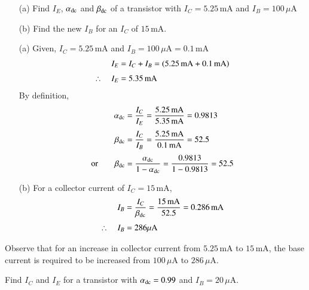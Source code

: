 \smallskip

\begin{example}\label{exam3.6}
\begin{itemize}
\item[\rm(a)] Find $I_{E}$, $\alpha_{\operatorname{dc}}$ and $\beta_{\operatorname{dc}}$ of a transistor with $I_{C}=5.25\,\text{mA}$ and $I_{B}=100\,\mu\text{A}$

\item[\rm(b)] Find the new $I_{B}$ for an $I_{C}$ of $15\,\text{mA}$.
\end{itemize}
\end{example}

\begin{solution}
\begin{itemize}
\item[(a)] Given, $I_{C}=5.25\,\text{mA}$ and $I_{B}=100\,\mu \text{A}=0.1\,\text{mA}$
\begin{align*}
I_{E} &= I_{C}+I_{B}=(5.25\text{\,mA}+0.1\text{\,mA})\\[3pt]
\therefore\quad I_{E} &= 5.35\,\text{mA}
\end{align*}
By definition,
\begin{align*}
\alpha_{\operatorname{dc}} &= \dfrac{I_{C}}{I_{E}}=\dfrac{5.25\text{\,mA}}{5.35\text{\,mA}}=0.9813\\[3pt]
\beta_{\operatorname{dc}} &= \frac{I_{C}}{I_{B}}=\dfrac{5.25\text{\,mA}}{0.1\text{\,mA}}=52.5\\[3pt]
\text{or}\qquad \beta_{\operatorname{dc}} &= \dfrac{\alpha_{\operatorname{dc}}}{1-\alpha_{\operatorname{dc}}}=\dfrac{0.9813}{1-0.9813}=52.5
\end{align*}

\item[(b)] For a collector current of $I_{C}=15\,\text{mA}$,
\begin{align*}
I_{B} &= \dfrac{I_{C}}{\beta_{\operatorname{dc}}}=\dfrac{15\,\text{mA}}{52.5}=0.286\,\text{mA}\\[3pt]
\therefore\quad I_{B} &= 286\mu \text{A}
\end{align*}
\end{itemize}

Observe that for an increase in collector current from $5.25\,\text{mA}$ to $15\,\text{mA}$, the base current is required to be increased from $100\,\mu\text{A}$ to $286\,\mu\text{A}$.
\end{solution}

\begin{example}\label{exam3.7}
Find $I_{C}$ and $I_{E}$ for a transistor with $\alpha_{\operatorname{dc}}=0.99$ and $I_{B}=20\,\mu \text{A}$.
\end{example}

